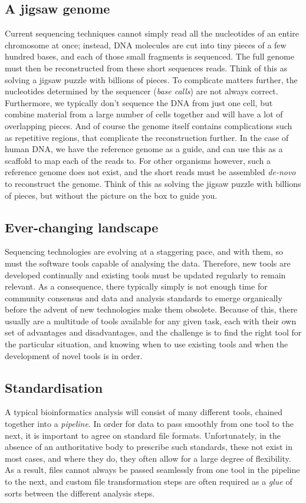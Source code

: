 \begin{justify}
\subsection{A jigsaw genome}
Current sequencing techniques cannot simply read all the nucleotides of an entire chromosome at once; instead, DNA molecules are cut into tiny pieces of a few hundred bases, and each of those small fragments is sequenced. The full genome must then be reconstructed from these short sequences reads. Think of this as solving a jigsaw puzzle with billions of pieces. To complicate matters further, the nucleotides determined by the sequencer (\emph{base calls}) are not always correct. Furthermore, we typically don't sequence the DNA from just one cell, but combine material from a large number of cells together and will have a lot of overlapping pieces. And of course the genome itself contains complications such as repetitive regions, that complicate the reconstruction further. In the case of human DNA, we have the reference genome as a guide, and can use this as a scaffold to map each of the reads to. For other organisms however, such a reference genome does not exist, and the short reads must be assembled \emph{de-novo} to reconstruct the genome. Think of this as solving the jigsaw puzzle with billions of pieces, but without the picture on the box to guide you.


\subsection{Ever-changing landscape}
Sequencing technologies are evolving at a staggering pace, and with them, so must the software tools capable of analysing the data. Therefore, new tools are developed continually and existing tools must be updated regularly to remain relevant. As a consequence, there typically simply is not enough time for community consensus and data and analysis standards to emerge organically before the advent of new technologies make them obsolete. Because of this, there usually are a multitude of tools available for any given task, each with their own set of advantages and disadvantages, and the challenge is to find the right tool for the particular situation, and knowing when to use existing tools and when the development of novel tools is in order.


\subsection{Standardisation}
A typical bioinformatics analysis will consist of many different tools, chained together into a \emph{pipeline}. In order for data to pass smoothly from one tool to the next, it is important to agree on standard file formats. Unfortunately, in the absence of an authoritative body to prescribe such standards, these not exist in most cases, and where they do, they often allow for a large degree of flexibility. As a result, files cannot always be passed seamlessly from one tool in the pipeline to the next, and custom file transformation steps are often required as a \emph{glue} of sorts between the different analysis steps.



\end{justify}
